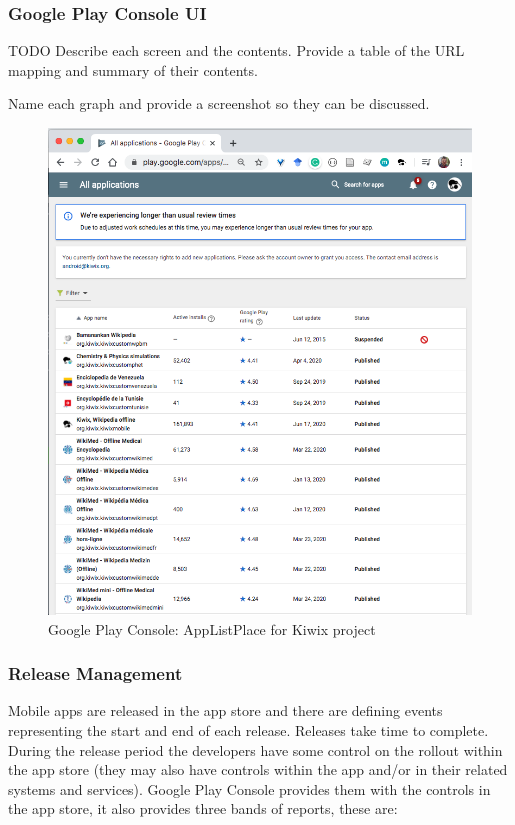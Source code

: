 \subsubsection{Google Play Console UI}

TODO Describe each screen and the contents. Provide a table of the URL mapping and summary of their contents.

Name each graph and provide a screenshot so they can be discussed.

\begin{figure}[htbp!]
    \centering
    \includegraphics[width=15cm]{images/android-vitals-screenshots/AppListPlace-kiwix-2020-Jun-17.png}
    \caption{Google Play Console: AppListPlace for Kiwix project}
    \label{fig:gpc-applistplace-kiwix}
\end{figure}

\subsubsection{Release Management}
Mobile apps are released in the app store and there are defining events representing the start and end of each release. Releases take time to complete. During the release period the developers have some control on the rollout within the app store (they may also have controls within the app and/or in their related systems and services). Google Play Console provides them with the controls in the app store, it also provides three bands of reports, these are:


